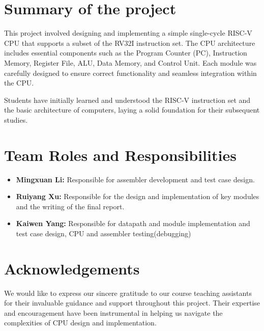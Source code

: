 \documentclass[11pt]{article}
\begin{document}
\section{Summary of the project}
This project involved designing and implementing a simple single-cycle RISC-V CPU that supports a subset of the RV32I instruction set. The CPU architecture includes essential components such as the Program Counter (PC), Instruction Memory, Register File, ALU, Data Memory, and Control Unit. Each module was carefully designed to ensure correct functionality and seamless integration within the CPU.

Students have initially learned and understood the RISC-V instruction set and the basic architecture of computers, laying a solid foundation for their subsequent studies.
\section{Team Roles and Responsibilities}
\begin{itemize}
    \item \textbf{Mingxuan Li:} Responsible for assembler development and test case design.
    \item \textbf{Ruiyang Xu:} Responsible for the design and implementation of key modules and the writing of the final report.
    \item \textbf{Kaiwen Yang:} Responsible for datapath and module implementation and test case design, CPU and assembler testing(debugging)
\end{itemize}

\section{Acknowledgements}
We would like to express our sincere gratitude to our course teaching assistants for their invaluable guidance and support throughout this project. Their expertise and encouragement have been instrumental in helping us navigate the complexities of CPU design and implementation.
\end{document}
